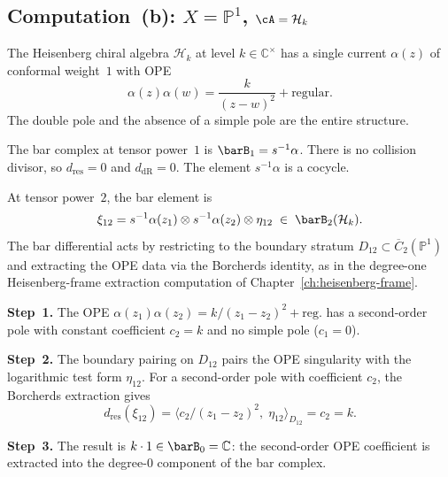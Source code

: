 \subsection*{Computation~(b): $X = \mathbb{P}^1$,
 $\cA = \mathcal{H}_k$}

The Heisenberg chiral algebra $\mathcal{H}_k$ at level
$k \in \mathbb{C}^\times$ has a single current $\alpha(z)$ of
conformal weight~$1$ with OPE
\begin{equation}\label{eq:fourier-heisenberg-ope}
\alpha(z)\alpha(w) = \frac{k}{(z-w)^2} + \text{regular}.
\end{equation}
The double pole and the absence of a simple pole are the entire
structure.

\begin{computation}[\texorpdfstring{$n = 1$}{n = 1}]\label{comp:fourier-heisenberg-n1}
The bar complex at tensor power~$1$ is $\barB_1 = s^{-1}\alpha$.
There is no collision divisor, so
$d_{\mathrm{res}} = 0$ and $d_{\mathrm{dR}} = 0$. The element
$s^{-1}\alpha$ is a cocycle.
\end{computation}

\begin{computation}[\texorpdfstring{$n = 2$}{n = 2}; \ClaimStatusProvedHere]
\label{comp:fourier-heisenberg-n2}
At tensor power~$2$, the bar element is
\begin{equation}\label{eq:fourier-bar2-heisenberg}
\xi_{12} = s^{-1}\alpha(z_1) \otimes s^{-1}\alpha(z_2)
 \otimes \eta_{12}
\;\in\; \barB_2(\mathcal{H}_k).
\end{equation}
The bar differential acts by restricting to the boundary stratum
$D_{12} \subset \overline{C}_2(\mathbb{P}^1)$ and extracting the
OPE data via the Borcherds identity, as in the degree-one
Heisenberg-frame extraction computation of
Chapter~\ref{ch:heisenberg-frame}.

\medskip\noindent\textbf{Step~1.}
The OPE $\alpha(z_1)\alpha(z_2) = k/(z_1 - z_2)^2 + \text{reg.}$
has a second-order pole with constant coefficient $c_2 = k$ and no
simple pole ($c_1 = 0$).

\medskip\noindent\textbf{Step~2.}
The boundary pairing on $D_{12}$ pairs the OPE singularity with the
logarithmic test form $\eta_{12}$. For a second-order pole with
coefficient $c_2$, the Borcherds extraction gives
\begin{equation}\label{eq:fourier-borcherds-extraction}
d_{\mathrm{res}}(\xi_{12})
= \bigl\langle c_2/(z_1 - z_2)^2,\; \eta_{12}
 \bigr\rangle_{D_{12}}
= c_2 = k.
\end{equation}

\medskip\noindent\textbf{Step~3.}
The result is $k \cdot 1 \in \barB_0 = \mathbb{C}$: the
second-order OPE coefficient is extracted into the degree-$0$
component of the bar complex.
\end{computation}

